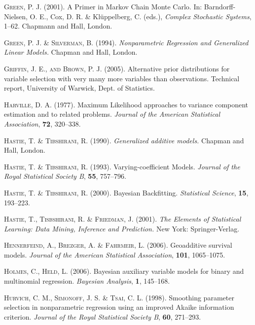 \documentclass[11pt,a4paper,twoside]{bayesxarticle}
\begin{document}
\begin{thebibliography}{99}
 {\scshape Green, P. J.} (2001).
 A Primer in Markov Chain Monte Carlo.
 In: Barndorff-Nielsen, O. E., Cox, D. R. \& Kl\"{u}ppelberg, C. (eds.),
 {\it Complex Stochastic Systems}, 1--62.
 Chapmann and Hall, London.

 {\scshape Green, P. J. \& Silverman, B.} (1994).
 {\it Nonparametric Regression and Generalized Linear Models.}
 Chapman and Hall, London.

 {\scshape Griffin, J. E., and Brown, P. J.} (2005). Alternative prior distributions
 for variable selection with very many more variables than observations. Technical
 report, University of Warwick, Dept. of Statistics.

 {\scshape Harville, D. A.} (1977).
 Maximum Likelihood approaches to variance component estimation and to related problems.
 {\it Journal of the American Statistical Association}, {\bf 72}, 320--338.

 {\scshape Hastie, T. \& Tibshirani, R.} (1990).
 {\it Generalized additive models.}
 Chapman and Hall, London.

 {\scshape Hastie, T. \& Tibshirani, R.} (1993).
 Varying-coefficient Models.
 {\it Journal of the Royal Statistical Society B}, {\bf 55}, 757--796.

 {\scshape Hastie, T. \& Tibshirani, R.} (2000).
 Bayesian Backfitting.
 {\it Statistical Science}, {\bf 15}, 193--223.

 {\scshape Hastie, T., Tisbshirani, R. \& Friedman, J.} (2001).
 {\it The Elements of Statistical Learning: Data Mining, Inference and Prediction.}
 New York: Springer-Verlag.

 {\scshape Hennerfeind, A., Brezger, A. \& Fahrmeir, L.} (2006).
 Geoadditive survival models.
 {\it Journal of the American Statistical Association}, {\bf 101}, 1065--1075.

 {\scshape Holmes, C., Held, L.} (2006).
 Bayesian auxiliary variable models for binary and multinomial regression.
 {\it Bayesian Analysis}, {\bf 1}, 145--168.

 {\scshape Hurvich, C. M., Simonoff, J. S. \& Tsai, C. L.} (1998).
 Smoothing parameter selection in nonparametric regression using an improved {A}kaike information criterion.
 {\it Journal of the Royal Statistical Society B}, {\bf 60}, 271--293.


\end{thebibliography}
\end{document}
